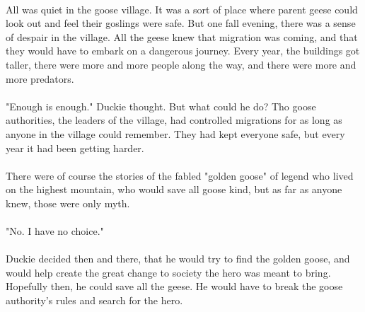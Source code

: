\documentclass[a4paper,11pt ]{book}
\begin{document}
\paragraph{} All was quiet in the goose village. It was a sort of place where parent geese could look out and feel their goslings were safe. But one fall evening, there was a sense of despair in the village. All the geese knew that migration was coming, and that they would have to embark on a dangerous journey. Every year, the buildings got taller, there were more and more people along the way, and there were more and more predators. 
\paragraph{} "Enough is enough." Duckie thought. But what could he do? Tho goose authorities, the leaders of the village, had controlled migrations for as long as anyone in the village could remember. They had kept everyone safe, but every year it had been getting harder.
\paragraph{} There were of course the stories of the fabled "golden goose" of legend who lived on the highest mountain, who would save all goose kind, but as far as anyone knew, those were only myth.
\paragraph{} "No. I have no choice." 
\paragraph{} Duckie decided then and there, that he would try to find the golden goose, and would help create the great change to society the hero was meant to bring. Hopefully then, he could save all the geese. He would have to break the goose authority's rules and search for the hero.
\vfill
\pagebreak






\end{document}
